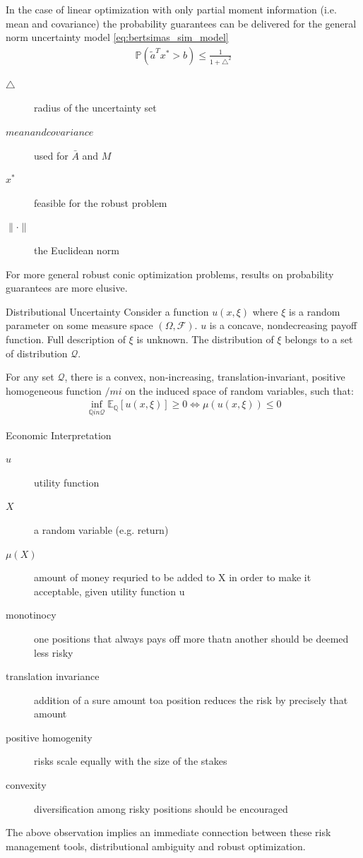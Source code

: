 \documentclass{beamer}
\begin{document}
\begin{frame}{}
In the case of linear optimization with only partial moment information (i.e. mean and covariance) the probability guarantees can be delivered for the general norm uncertainty model \ref{eq:bertsimas_sim_model}
\begin{align*}
\mathbb{P}(\tilde{a}^{T}x^{*} > b) \leq \frac{1}{1 + \triangle^{2}}
\end{align*}
\begin{description}
\item [$\triangle$] radius of the uncertainty set
\item [$mean and covariance$] used for $\bar{A}$ and $M$
\item [$x^{*}$] feasible for the robust problem
\item [$\lVert \cdot \rVert$] the Euclidean norm
\end{description}

For more general robust conic optimization problems, results on probability guarantees are more elusive.
\end{frame}

\begin{frame}{Distributional Uncertainty}
Consider a function $u(x,\xi)$ where $\xi$ is a random parameter on some measure space $(\Omega, \mathcal{F})$.
$u$ is a concave, nondecreasing payoff function.
Full description of $\xi$ is unknown. The distribution of $\xi$ belongs to a set of distribution $\mathcal{Q}$.

For any set $\mathcal{Q}$, there is a convex, non-increasing, translation-invariant, positive homogeneous function $/mi$ on the induced space of random variables, such that:
\begin{align}
\inf_{\mathbb{Q} in \mathcal{Q}} \mathbb{E}_{\mathbb{Q}}[u(x,\xi)] \geq 0 \Leftrightarrow \mu(u(x,\xi)) \leq 0
\end{align}
\end{frame}

\begin{frame}{Economic Interpretation}
\begin{description}
\item [$u$] utility function
\item [$X$] a random variable (e.g. return)
\item [$\mu(X)$] amount of money requried to be added to X in order to make it acceptable, given utility function u
\item [monotinocy] one positions that always pays off more thatn another should be deemed less risky
\item [translation invariance] addition of a sure amount toa position reduces the risk by precisely that amount
\item [positive homogenity] risks scale equally with the size of the stakes
\item [convexity] diversification among risky positions should be encouraged
\end{description}
The above observation implies an immediate connection between these risk management tools, distributional ambiguity and robust optimization.
\end{frame}
\end{document}
